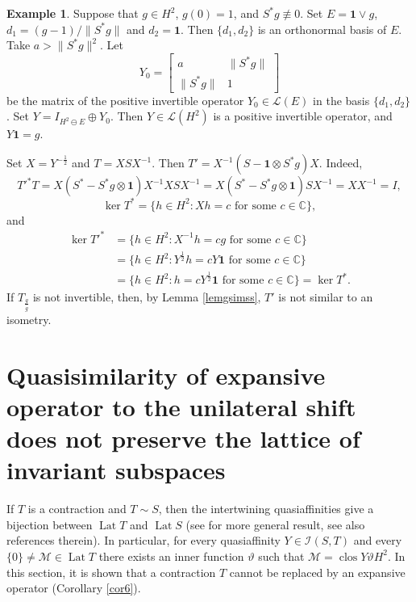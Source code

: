 \documentclass[a4paper,oneside,11pt]{amsart}
\numberwithin{equation}{section}
\theoremstyle{plain}
\theoremstyle{definition}
\newtheorem{example}[theorem]{Example}
\begin{document}
\begin{example} Suppose that  $g\in H^2$,   $g(0)=1$, and $S^*g\not\equiv 0$. 
Set $E=\mathbf{1}\vee g$, $d_1=(g-1)/\|S^*g\|$ and  $d_2=\mathbf{1}$. 
Then $\{d_1,d_2\}$ is an orthonormal basis of $E$.
Take $a>\|S^*g\|^2$. Let
\begin{equation*} 
Y_0=\left[\begin{matrix}a & \|S^*g\| \\ \|S^*g\| & 1\end{matrix}\right]
\end{equation*}
be the matrix of the positive invertible operator  $Y_0\in\mathcal L(E)$ in the basis $\{d_1,d_2\}$. 
Set $Y=I_{H^2\ominus E}\oplus Y_0$. Then $Y\in\mathcal L(H^2)$ is a positive invertible operator, and $Y\mathbf{1}=g$.

Set $X=Y^{-\frac{1}{2}}$ and  $T=XSX^{-1}$. Then $T'=X^{-1}(S-\mathbf{1}\otimes S^*g)X$.  
Indeed, 
\begin{equation*} T'^*T=X(S^*-S^*g\otimes\mathbf{1})X^{-1}XSX^{-1}=X(S^*-S^*g\otimes\mathbf{1})SX^{-1}=XX^{-1}=I,
\end{equation*}
\begin{equation*} \ker T^*=\{h\in H^2: Xh=c \text{ for some } c\in\mathbb C\},
\end{equation*}
and
\begin{align*} \ker T'^* & =\{h\in H^2: X^{-1}h=cg \text{ for some }  c\in\mathbb C\}\\&=
\{h\in H^2: Y^{\frac{1}{2}}h=cY\mathbf{1}\text{ for some } c\in\mathbb C\} \\ & =
\{h\in H^2: h=cY^{\frac{1}{2}}\mathbf{1}\text{ for some }  c\in\mathbb C\}= \ker T^*.
\end{align*}
If  $T_{\frac{g}{\overline g}}$ is not  invertible, then, by Lemma \ref{lemgsimss}, $T'$ is not similar to an isometry.
\end{example}

\section{Quasisimilarity of expansive operator to the unilateral shift does not preserve the lattice of invariant subspaces}

 If $T$ is a contraction and $T\sim S$, then the intertwining quasiaffinities give a bijection between 
$\operatorname{Lat}T$ and $\operatorname{Lat}S$ (see \cite{gamal02} for more general result, see also references therein). 
 In particular, 
for every quasiaffinity $Y\in\mathcal I(S,T)$  
and every $\{0\}\neq\mathcal M\in \operatorname{Lat}T$ there exists an inner function $\vartheta$ such that 
 $\mathcal M=\operatorname{clos}Y\vartheta H^2$. In this section, it is shown that a contraction $T$ cannot be replaced by an expansive operator 
(Corollary \ref{cor6}). 
\end{document}
